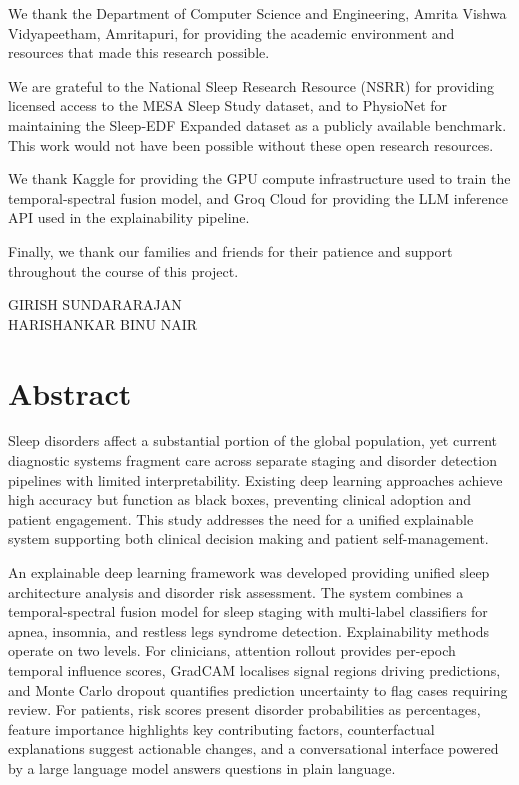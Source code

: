\documentclass[a4paper, 12pt]{report}
\theoremstyle{definition}
\begin{document}
We thank the Department of Computer Science and Engineering, Amrita Vishwa Vidyapeetham, Amritapuri, for providing the academic environment and resources that made this research possible.

We are grateful to the National Sleep Research Resource (NSRR) for providing licensed access to the MESA Sleep Study dataset, and to PhysioNet for maintaining the Sleep-EDF Expanded dataset as a publicly available benchmark. This work would not have been possible without these open research resources.

We thank Kaggle for providing the GPU compute infrastructure used to train the temporal-spectral fusion model, and Groq Cloud for providing the LLM inference API used in the explainability pipeline.

Finally, we thank our families and friends for their patience and support throughout the course of this project.

	\vspace{1cm}
	\begin{flushright}
		GIRISH SUNDARARAJAN\\
		HARISHANKAR BINU NAIR
	\end{flushright}
	\listoffigures
	\listoftables
	\newpage

\chapter*{Abstract}

Sleep disorders affect a substantial portion of the global population, yet current diagnostic systems fragment care across separate staging and disorder detection pipelines with limited interpretability. Existing deep learning approaches achieve high accuracy but function as black boxes, preventing clinical adoption and patient engagement. This study addresses the need for a unified explainable system supporting both clinical decision making and patient self-management.

An explainable deep learning framework was developed providing unified sleep architecture analysis and disorder risk assessment. The system combines a temporal-spectral fusion model for sleep staging with multi-label classifiers for apnea, insomnia, and restless legs syndrome detection. Explainability methods operate on two levels. For clinicians, attention rollout provides per-epoch temporal influence scores, GradCAM localises signal regions driving predictions, and Monte Carlo dropout quantifies prediction uncertainty to flag cases requiring review. For patients, risk scores present disorder probabilities as percentages, feature importance highlights key contributing factors, counterfactual explanations suggest actionable changes, and a conversational interface powered by a large language model answers questions in plain language.
\end{document}
